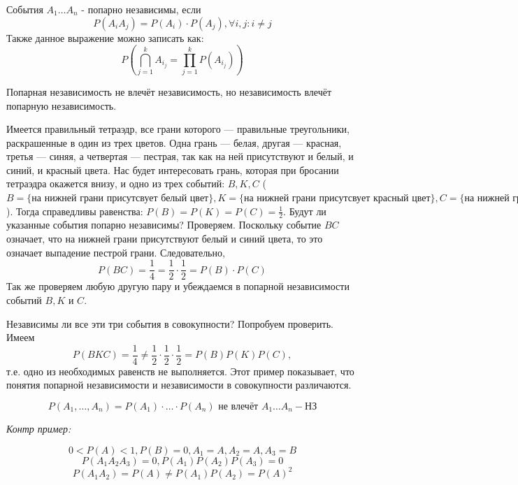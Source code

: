 \begin{definition}
	События $A_1 \dots A_n$ - попарно независимы, если
	\[ P(A_iA_j) = P(A_i) \cdot P(A_j), \forall i,j: i \ne j \]
	Также данное выражение можно записать как:
	\[ P \left( \bigcap_{j = 1}^{k} A_{i_j} = \prod_{j = 1}^{k} P(A_{i_j}) \right) \]
\end{definition}

Попарная независимость не влечёт независимость, но независимость влечёт попарную независимость.

\begin{exmp}
	Имеется правильный тетраэдр, все грани которого — правильные треугольники, раскрашенные в один из трех цветов. Одна грань — белая, другая — красная, третья — синяя, а четвертая — пестрая, так как на ней присутствуют и белый, и синий, и красный цвета. Нас будет интересовать грань, которая при бросании тетраэдра окажется внизу, и одно из трех событий: $B, K, C$ ($B = \{ \text{на нижней грани присутсвует белый цвет} \}, K = \{ \text{на нижней грани присутсвует красный цвет} \}, C = \{ \text{на нижней грани присутсвует синий цвет} \}$). Тогда справедливы равенства: $P(B) = P(K) = P(C) = \frac{1}{2}$. Будут ли указанные события попарно независимы? Проверяем. Поскольку событие $BC$ означает, что на нижней грани присутствуют белый и синий цвета, то это означает выпадение пестрой грани. Следовательно,
	\[ P(BC) = \frac{1}{4} = \frac{1}{2} \cdot \frac{1}{2} = P(B) \cdot P(C) \]
	Так же проверяем любую другую пару и убеждаемся в попарной независимости событий $B, K$ и $C$.
	
	Независимы ли все эти три события в совокупности? Попробуем проверить. Имеем
	\[ P(BKC) = \frac{1}{4} \ne \frac{1}{2} \cdot \frac{1}{2} \cdot \frac{1}{2} = P(B) P(K) P(C), \]
	т.е. одно из необходимых равенств не выполняется. Этот пример показывает, что понятия попарной независимости и независимости в совокупности различаются.
\end{exmp}

\begin{exmp}
	\[ P(A_1, \dots, A_n) = P(A_1) \cdot \dots \cdot P(A_n) \text{ не влечёт } A_1 \dots A_n - \text{НЗ} \]
	
	\textit{Контр пример:}
	
	\[ 0 < P(A) < 1, P(B) = 0, A_1 = A, A_2 = A, A_3 = B \]
	\[ P(A_1A_2A_3) = 0, P(A_1)P(A_2)P(A_3) = 0 \]
	\[ P(A_1A_2) = P(A) \ne P(A_1)P(A_2) = P(A)^2 \]
\end{exmp}

